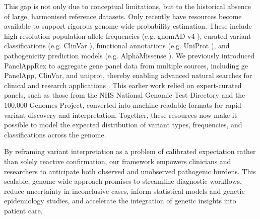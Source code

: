 This gap is not only due to conceptual limitations, but to the historical absence of large, harmonised reference datasets. 
Only recently have resources become available to support rigorous genome-wide probability estimation. These include high-resolution population allele frequencies (e.g. gnomAD v4 \cite{karczewski2020mutational}), 
curated variant classifications (e.g. ClinVar \cite{landrum_clinvar_2018}), 
functional annotations (e.g. UniProt \cite{the_uniprot_consortium_uniprot_2025}),
and pathogenicity prediction models (e.g. AlphaMissense \cite{cheng_accurate_2023}). 
We previously introduced PanelAppRex to aggregate gene panel data from multiple sources, including \ac{ge} PanelApp, ClinVar, and \ac{uniprot}, thereby enabling advanced natural searches for clinical and research applications \cite{lawless_panelapprex_2025, martin_panelapp_2019, landrum_clinvar_2018, the_uniprot_consortium_uniprot_2025}. 
This earlier work relied on expert-curated panels, such as those from the NHS National Genomic Test Directory and the 100,000 Genomes Project, converted into machine-readable formats for rapid variant discovery and interpretation. 
Together, these resources now make it possible to model the expected distribution of variant types, frequencies, and classifications across the genome.

By reframing variant interpretation as a problem of calibrated expectation rather than solely reactive confirmation, our framework empowers clinicians and researchers to anticipate both observed and unobserved pathogenic burdens. 
This scalable, genome-wide approach promises to streamline diagnostic workflows, reduce uncertainty in inconclusive cases, inform statistical models and genetic epidemiology studies, and accelerate the integration of genetic insights into patient care.



